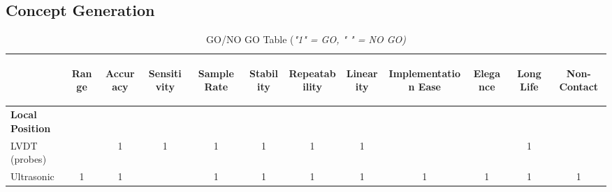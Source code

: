 \documentclass[12pt]{article}
\begin{document}
\subsection{Concept Generation}
\clearpage
\begin{table}[H]
  \centering
  \caption{GO/NO GO Table (\textit{"1" = GO, " " = NO GO)}}
    \begin{tabular}{p{15.645em}|c|c|c|c|c|c|c|c|c|c|c}
    \multicolumn{1}{r}{} & \multicolumn{1}{c}{\begin{sideways}\textbf{Range}\end{sideways}} & \multicolumn{1}{c}{\begin{sideways}\textbf{Accuracy}\end{sideways}} & \multicolumn{1}{c}{\begin{sideways}\textbf{Sensitivity}\end{sideways}} & \multicolumn{1}{c}{\begin{sideways}\textbf{Sample Rate}\end{sideways}} & \multicolumn{1}{c}{\begin{sideways}\textbf{Stability}\end{sideways}} & \multicolumn{1}{c}{\begin{sideways}\textbf{Repeatability}\end{sideways}} & \multicolumn{1}{c}{\begin{sideways}\textbf{Linearity}\end{sideways}} & \multicolumn{1}{c}{\begin{sideways}\textbf{Implementation Ease}\end{sideways}} & \multicolumn{1}{c}{\begin{sideways}\textbf{Elegance}\end{sideways}} & \multicolumn{1}{c}{\begin{sideways}\textbf{Long Life}\end{sideways}} & \begin{sideways}\textbf{Non-Contact}\end{sideways} \\
    \midrule
    \textbf{Local Position} &       &       &       &       &       &       &       &       &       &       &  \\
    LVDT (probes) &       & 1     & 1     & 1     & 1     & 1     & 1     &       &       & 1     &  \\
\rowcolor{green}    Ultrasonic & 1     & 1     &       & 1     & 1     & 1     & 1     & 1     & 1     & 1     & 1 \\

\end{tabular}
\end{table}
\end{document}
